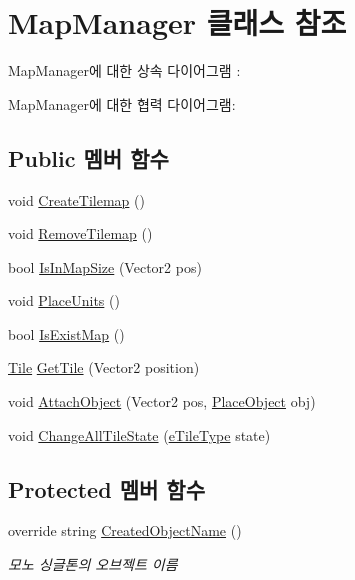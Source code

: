 \hypertarget{class_map_manager}{}\section{Map\+Manager 클래스 참조}
\label{class_map_manager}


Map\+Manager에 대한 상속 다이어그램 \+: 


Map\+Manager에 대한 협력 다이어그램\+:
\subsection*{Public 멤버 함수}
\begin{DoxyCompactItemize}
\item 
void \hyperlink{class_map_manager_aa6125f2ca4b3c4e8858f73f5e65d385b}{Create\+Tilemap} ()
\item 
void \hyperlink{class_map_manager_aac20afabde4946e32ce1e719c72e0f50}{Remove\+Tilemap} ()
\item 
bool \hyperlink{class_map_manager_a504d7a68ace64557bc3c3254a8b1cddc}{Is\+In\+Map\+Size} (Vector2 pos)
\item 
void \hyperlink{class_map_manager_a0b4f29a9504f7004c7b562fa49ba84cd}{Place\+Units} ()
\item 
bool \hyperlink{class_map_manager_a9a18efae73b0d690d2bc6c8ac8703a02}{Is\+Exist\+Map} ()
\item 
\hyperlink{class_tile}{Tile} \hyperlink{class_map_manager_ae457099efdd1a804add3b851b2bc7691}{Get\+Tile} (Vector2 position)
\item 
void \hyperlink{class_map_manager_af1766fb2d9800aaea322edede0a8ebf6}{Attach\+Object} (Vector2 pos, \hyperlink{class_place_object}{Place\+Object} obj)
\item 
void \hyperlink{class_map_manager_a68f796431393b7239320ab1f5200213a}{Change\+All\+Tile\+State} (\hyperlink{_tile_8cs_a271bc07be325bca511bcb747e0ff2fda}{e\+Tile\+Type} state)
\end{DoxyCompactItemize}
\subsection*{Protected 멤버 함수}
\begin{DoxyCompactItemize}
\item 
override string \hyperlink{class_map_manager_aa3459a9fe2d748c6e9f2c3da8a6273cd}{Created\+Object\+Name} ()
\begin{DoxyCompactList}\small\item\em 모노 싱글톤의 오브젝트 이름 \end{DoxyCompactList}\end{DoxyCompactItemize}

